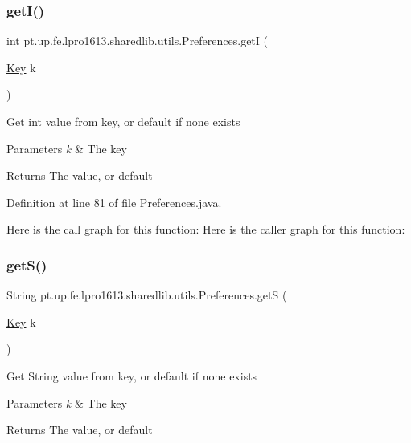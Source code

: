 \subsubsection{\texorpdfstring{get\+I()}{getI()}}
{\footnotesize\ttfamily int pt.\+up.\+fe.\+lpro1613.\+sharedlib.\+utils.\+Preferences.\+getI (\begin{DoxyParamCaption}\item[{\hyperlink{interfacept_1_1up_1_1fe_1_1lpro1613_1_1sharedlib_1_1utils_1_1_preferences_1_1_key}{Key}}]{k }\end{DoxyParamCaption})}

Get int value from key, or default if none exists


\begin{DoxyParams}{Parameters}
{\em k} & The key \\
\hline
\end{DoxyParams}
\begin{DoxyReturn}{Returns}
The value, or default 
\end{DoxyReturn}


Definition at line 81 of file Preferences.\+java.

Here is the call graph for this function\+:
Here is the caller graph for this function\+:
\hypertarget{classpt_1_1up_1_1fe_1_1lpro1613_1_1sharedlib_1_1utils_1_1_preferences_aada2e7f8fe94b6a7ef78cfb30637b982}{}\label{classpt_1_1up_1_1fe_1_1lpro1613_1_1sharedlib_1_1utils_1_1_preferences_aada2e7f8fe94b6a7ef78cfb30637b982} 
\subsubsection{\texorpdfstring{get\+S()}{getS()}}
{\footnotesize\ttfamily String pt.\+up.\+fe.\+lpro1613.\+sharedlib.\+utils.\+Preferences.\+getS (\begin{DoxyParamCaption}\item[{\hyperlink{interfacept_1_1up_1_1fe_1_1lpro1613_1_1sharedlib_1_1utils_1_1_preferences_1_1_key}{Key}}]{k }\end{DoxyParamCaption})}

Get String value from key, or default if none exists


\begin{DoxyParams}{Parameters}
{\em k} & The key \\
\hline
\end{DoxyParams}
\begin{DoxyReturn}{Returns}
The value, or default 
\end{DoxyReturn}


